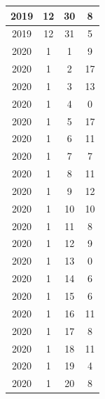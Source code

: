 \begin{longtable} {|c|c|c|c|}
\hline
2019         & 12           & 30           & 8                         \\ 
\hline
2019         & 12           & 31           & 5                         \\ 
\hline
2020         & 1            & 1            & 9                         \\ 
\hline
2020         & 1            & 2            & 17                        \\ 
\hline
2020         & 1            & 3            & 13                        \\ 
\hline
2020         & 1            & 4            & 0                         \\ 
\hline
2020         & 1            & 5            & 17                        \\ 
\hline
2020         & 1            & 6            & 11                        \\ 
\hline
2020         & 1            & 7            & 7                         \\ 
\hline
2020         & 1            & 8            & 11                        \\ 
\hline
2020         & 1            & 9            & 12                        \\ 
\hline
2020         & 1            & 10           & 10                        \\ 
\hline
2020         & 1            & 11           & 8                         \\ 
\hline
2020         & 1            & 12           & 9                         \\ 
\hline
2020         & 1            & 13           & 0                         \\ 
\hline
2020         & 1            & 14           & 6                         \\ 
\hline
2020         & 1            & 15           & 6                         \\ 
\hline
2020         & 1            & 16           & 11                        \\ 
\hline
2020         & 1            & 17           & 8                         \\ 
\hline
2020         & 1            & 18           & 11                        \\ 
\hline
2020         & 1            & 19           & 4                         \\ 
\hline
2020         & 1            & 20           & 8                         \\ 

\end{longtable}
